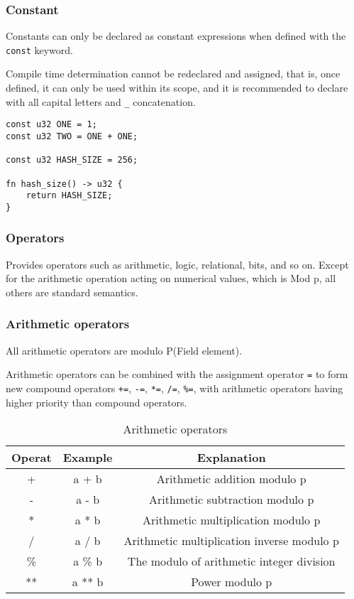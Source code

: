 \subsubsection{Constant}

Constants can only be declared as constant expressions when defined with the \texttt{const} keyword.

Compile time determination cannot be redeclared and assigned, that is, once defined, it can only be used within its scope, and it is recommended to declare with all capital letters and \texttt{\_} concatenation. 

\begin{lstlisting}
const u32 ONE = 1;
const u32 TWO = ONE + ONE;

const u32 HASH_SIZE = 256;

fn hash_size() -> u32 {
    return HASH_SIZE;
}
\end{lstlisting}

\subsubsection{Operators}

Provides operators such as arithmetic, logic, relational, bits, and so on. Except for the arithmetic operation acting on numerical values, which is Mod p, all others are standard semantics. 

\subsubsection*{Arithmetic operators}

All arithmetic operators are modulo P(Field element).

Arithmetic operators can be combined with the assignment operator \texttt{=} to form new compound operators \texttt{+=}, \texttt{-=}, \texttt{*=}, \texttt{/=}, \texttt{\%=}, with arithmetic operators having higher priority than compound operators. 

\begin{table}
\centering
\begin{tabular}{c|c|c}
Operat & Example & Explanation \\ \hline
+ & a + b & Arithmetic addition modulo p \\
- & a - b & Arithmetic subtraction modulo p \\
* & a * b & Arithmetic multiplication modulo p \\
/ & a / b & Arithmetic multiplication inverse modulo p \\
\% & a \% b & The modulo of arithmetic integer division \\
** & a ** b & Power modulo p \\
\end{tabular}
\caption{Arithmetic operators}
\end{table}

